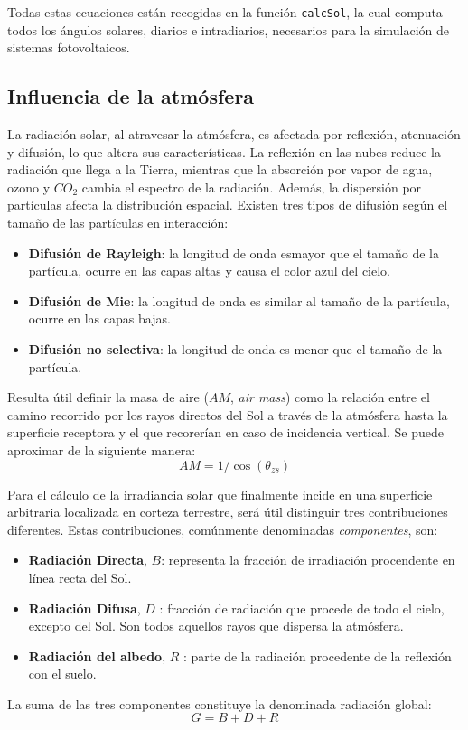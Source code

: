 Todas estas ecuaciones están recogidas en la función \texttt{calcSol}, la cual computa todos los ángulos solares, diarios e intradiarios, necesarios para la simulación de sistemas fotovoltaicos.

\subsection{Influencia de la atmósfera}
\label{sec:orgad65191}
La radiación solar, al atravesar la atmósfera, es afectada por reflexión, atenuación y difusión, lo que altera sus características. La reflexión en las nubes reduce la radiación que llega a la Tierra, mientras que la absorción por vapor de agua, ozono y \(CO_2\) cambia el espectro de la radiación. Además, la dispersión por partículas afecta la distribución espacial. Existen tres tipos de difusión según el tamaño de las partículas en interacción:
\begin{itemize}
\item \textbf{Difusión de Rayleigh}: la longitud de onda esmayor que el tamaño de la partícula, ocurre en las capas altas y causa el color azul del cielo.
\item \textbf{Difusión de Mie}: la longitud de onda es similar al tamaño de la partícula, ocurre en las capas bajas.
\item \textbf{Difusión no selectiva}: la longitud de onda es menor que el tamaño de la partícula.
\end{itemize}

Resulta útil definir la masa de aire (\(AM\), \emph{air mass}) como la relación entre el camino recorrido por los rayos directos del Sol a través de la atmósfera hasta la superficie receptora y el que recorerían en caso de incidencia vertical. Se puede aproximar de la siguiente manera: 
\begin{equation}
AM = 1/\cos(\theta_{zs})
\end{equation}

Para el cálculo de la irradiancia solar que finalmente incide en una superficie arbitraria localizada en corteza terrestre, será útil distinguir tres contribuciones diferentes. Estas contribuciones, comúnmente denominadas \emph{componentes}, son:
\begin{itemize}
\item \textbf{Radiación Directa}, \(B\): representa la fracción de irradiación procendente en línea recta del Sol. 
\item \textbf{Radiación Difusa}, \(D\) : fracción de radiación que procede de todo el cielo, excepto del Sol. Son todos aquellos rayos que dispersa la atmósfera.
\item \textbf{Radiación del albedo}, \(R\) : parte de la radiación procedente de la reflexión con el suelo.
\end{itemize}
La suma de las tres componentes constituye la denominada radiación global: 
\begin{equation}
G = B + D + R
\label{eq:comp_rad}
\end{equation}


